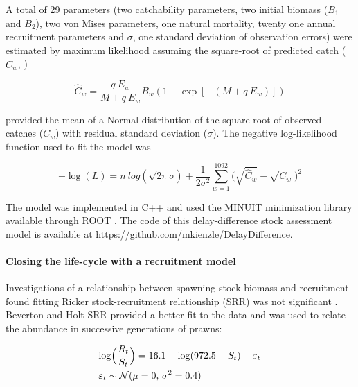 A total of 29 parameters (two catchability parameters, two initial biomass ($B_{1}$ and $B_{2}$), two von Mises parameters, one natural mortality, twenty one annual recruitment parameters and $\sigma$, one standard deviation of observation errors) were estimated by maximum likelihood assuming the square-root of predicted catch ($\hat{C}_{w}$, \cite{quin99b}) 

\begin{equation}
        \hat{C}_{w} = \frac{q \ E_{w}}{ M + q \ E_{w}}  B_{w} ( 1 - \exp[-(M + q \ E_{w})])
\end{equation}

\noindent provided the mean of a Normal distribution of the square-root of observed catches ($C_{w}$) \citep{dichmont2003application} with residual standard deviation ($\sigma$). The negative log-likelihood function used to fit the model was \citep{haddon2010modelling}

\begin{equation}
-\log(L) = n \ log(\sqrt{2 \pi} \sigma) + \frac{1}{2 \sigma^{2}} \sum_{w=1}^{1092} \bigl ( \sqrt{\hat{C}_{w}} - \sqrt{C_{w}} \ \bigr ) ^{2}
\end{equation}

The model was implemented in C++ and used the MINUIT minimization library \citep{minuit2} available through ROOT \citep{root}. The code of this delay-difference stock assessment model is available at \url{https://github.com/mkienzle/DelayDifference}.

\paragraph{Closing the life-cycle with a recruitment model} 
Investigations of a relationship between spawning stock biomass and recruitment found fitting Ricker stock-recruitment relationship (SRR) was not significant \citep{Kienzle2014138}. Beverton and Holt SRR provided a better fit to the data \citep{KienzleEtAl2017} and was used to relate the abundance in successive generations of prawns:

\begin{equation}
    \begin{split}
  &{\rm log} \Bigl(\frac{R_{t}}{S_{t}}\Bigr) = 16.1 - {\rm log}(972.5 + S_{t}) + \varepsilon_{t} \\
  &\varepsilon_{t} \sim \mathcal{N}(\mu=0,\,\sigma^{2}=0.4)  
    \end{split}
  \end{equation}

